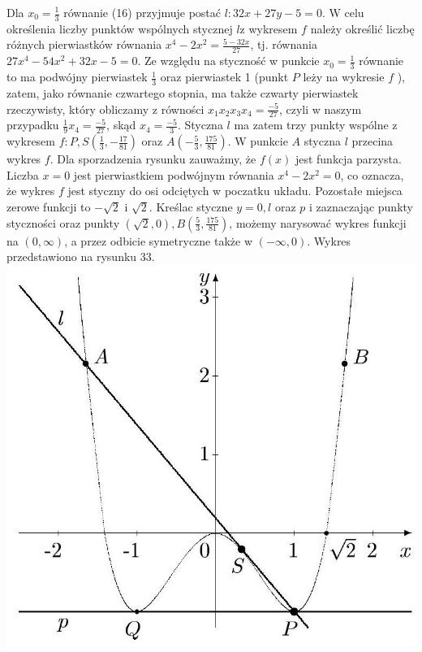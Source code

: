 \documentclass[10pt]{article}
\begin{document}
Dla $x_{0}=\frac{1}{3}$ równanie (16) przyjmuje postać $l: 32 x+27 y-5=0$. W celu określenia liczby punktów wspólnych stycznej $l \mathrm{z}$ wykresem $f$ należy określić liczbę różnych pierwiastków równania $x^{4}-2 x^{2}=\frac{5-32 x}{27}$, tj. równania $27 x^{4}-54 x^{2}+32 x-5=0$. Ze względu na styczność w punkcie $x_{0}=\frac{1}{3}$ równanie to ma podwójny pierwiastek $\frac{1}{3}$ oraz pierwiastek 1 (punkt $P$ leży na wykresie $f$ ), zatem, jako równanie czwartego stopnia, ma także czwarty pierwiastek rzeczywisty, który obliczamy z równości $x_{1} x_{2} x_{3} x_{4}=\frac{-5}{27}$, czyli w naszym przypadku $\frac{1}{9} x_{4}=\frac{-5}{27}$, skąd $x_{4}=\frac{-5}{3}$. Styczna $l$ ma zatem trzy punkty wspólne z wykresem $f: P, S\left(\frac{1}{3},-\frac{17}{81}\right)$ oraz $A\left(-\frac{5}{3}, \frac{175}{81}\right)$. W punkcie $A$ styczna $l$ przecina wykres $f$. Dla sporzadzenia rysunku zauważmy, że $f(x)$ jest funkcja parzysta. Liczba $x=0$ jest pierwiastkiem podwójnym równania $x^{4}-2 x^{2}=0$, co oznacza, że wykres $f$ jest styczny do osi odciętych w poczatku układu. Pozostałe miejsca zerowe funkcji to $-\sqrt{2}$ i $\sqrt{2}$. Kreślac styczne $y=0, l$ oraz $p$ i zaznaczając punkty styczności oraz punkty $(\sqrt{2}, 0), B\left(\frac{5}{3}, \frac{175}{81}\right)$, możemy narysować wykres funkcji na $(0, \infty)$, a przez odbicie symetryczne także w $(-\infty, 0)$. Wykres przedstawiono na rysunku 33.\\
\includegraphics[max width=\textwidth, center]{2024_11_16_fe5b564401bf7db98894g-131}
\end{document}
